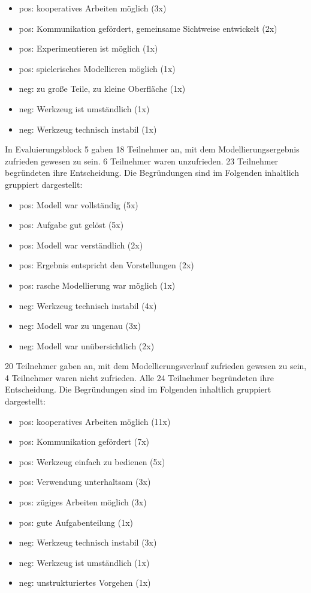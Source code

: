 \begin{itemize}
	\item pos: kooperatives Arbeiten möglich (3x)
	\item pos: Kommunikation gefördert, gemeinsame Sichtweise entwickelt (2x)
	\item pos: Experimentieren ist möglich (1x)
	\item pos: spielerisches Modellieren möglich (1x)
	\item neg: zu große Teile, zu kleine Oberfläche (1x)
	\item neg: Werkzeug ist umständlich (1x)
	\item neg: Werkzeug technisch instabil (1x)
\end{itemize}

In Evaluierungsblock 5 gaben 18 Teilnehmer an, mit dem Modellierungsergebnis zufrieden gewesen zu sein. 6 Teilnehmer waren unzufrieden. 23 Teilnehmer begründeten ihre Entscheidung. Die Begründungen sind im Folgenden inhaltlich gruppiert dargestellt:

\begin{itemize}
	\item pos: Modell war vollständig (5x)
	\item pos: Aufgabe gut gelöst (5x)
	\item pos: Modell war verständlich (2x)
	\item pos: Ergebnis entspricht den Vorstellungen (2x)
	\item pos: rasche Modellierung war möglich (1x)
	\item neg: Werkzeug technisch instabil (4x)
	\item neg: Modell war zu ungenau (3x)
	\item neg: Modell war unübersichtlich (2x)
\end{itemize}

20 Teilnehmer gaben an, mit dem Modellierungsverlauf zufrieden gewesen zu sein, 4 Teilnehmer waren nicht zufrieden. Alle 24 Teilnehmer begründeten ihre Entscheidung. Die Begründungen sind im Folgenden inhaltlich gruppiert dargestellt:

\begin{itemize}
	\item pos: kooperatives Arbeiten möglich (11x)
	\item pos: Kommunikation gefördert (7x)
	\item pos: Werkzeug einfach zu bedienen (5x)
	\item pos: Verwendung unterhaltsam (3x)
	\item pos: zügiges Arbeiten möglich (3x)
	\item pos: gute Aufgabenteilung (1x)
	\item neg: Werkzeug technisch instabil (3x)
	\item neg: Werkzeug ist umständlich (1x)
	\item neg: unstrukturiertes Vorgehen (1x)
\end{itemize}

